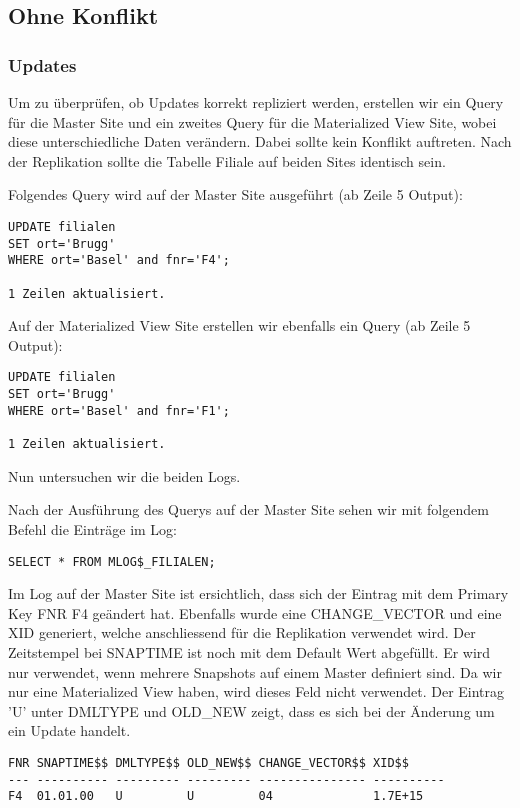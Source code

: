 \documentclass[11pt,a4paper,parskip=half]{scrartcl}
\begin{document}
\subsection{Ohne Konflikt}
\subsubsection{Updates}
Um zu überprüfen, ob Updates korrekt repliziert werden, erstellen wir ein Query für die Master Site und ein zweites Query für die Materialized View Site, wobei diese unterschiedliche Daten verändern. Dabei sollte kein Konflikt auftreten. Nach der Replikation sollte die Tabelle Filiale auf beiden Sites identisch sein.

Folgendes Query wird auf der Master Site ausgeführt (ab Zeile 5 Output):
\begin{lstlisting}
UPDATE filialen
SET ort='Brugg'
WHERE ort='Basel' and fnr='F4'; 

1 Zeilen aktualisiert.
\end{lstlisting}

Auf der Materialized View Site erstellen wir ebenfalls ein Query (ab Zeile 5 Output):
\begin{lstlisting}
UPDATE filialen
SET ort='Brugg'
WHERE ort='Basel' and fnr='F1'; 

1 Zeilen aktualisiert.
\end{lstlisting}

Nun untersuchen wir die beiden Logs.

Nach der Ausführung des Querys auf der Master Site sehen wir mit folgendem Befehl die Einträge im Log:
\begin{lstlisting}
SELECT * FROM MLOG$_FILIALEN;
\end{lstlisting}

Im Log auf der Master Site ist ersichtlich, dass sich der Eintrag mit dem Primary Key FNR F4 geändert hat. Ebenfalls wurde eine CHANGE\_VECTOR und eine XID generiert, welche anschliessend für die Replikation verwendet wird.  Der Zeitstempel bei SNAPTIME ist noch mit dem Default Wert abgefüllt. Er wird nur verwendet, wenn mehrere Snapshots auf einem Master definiert sind. Da wir nur eine Materialized View haben, wird dieses Feld nicht verwendet. Der Eintrag 'U' unter DMLTYPE und  OLD\_NEW zeigt, dass es sich bei der Änderung um ein Update handelt.
\begin{lstlisting}
FNR SNAPTIME$$ DMLTYPE$$ OLD_NEW$$ CHANGE_VECTOR$$ XID$$
--- ---------- --------- --------- --------------- ----------
F4  01.01.00   U         U         04              1.7E+15 
\end{lstlisting}
\end{document}
